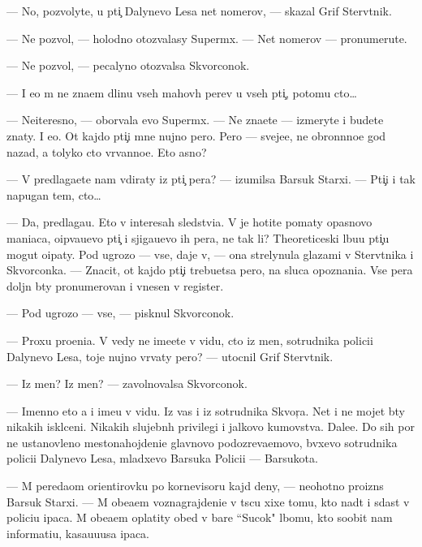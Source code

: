 \documentclass[12pt]{book}
\begin{document}
— No, pozvolyte, u pti{\c} Dalynevo Lesa net nomerov, — skazal Grif Sterv{\ia}tnik.

— Ne pozvol{\io}, — holodno otozvalasy Superm{\yi}x. — Net nomerov — pronumeru{\y}te.

— Ne pozvol{\io}, — pecalyno otozvalsa Skvorconok.

— I {\y}e{\x}o m{\yi} ne zna{\y}em dlinu vseh mahov{\yi}h per{\y}ev u vseh pti{\c}, potomu cto…

— Neiteresno, — oborvala {\y}evo Superm{\yi}x. — Ne zna{\y}ete — izmeryte i budete znaty. I {\y}e{\x}o. Ot kajdo{\y} pti{\c}i mne nujno pero. Pero — sveje{\y}e, ne obron{\e}nno{\y}e god nazad, a tolyko cto v{\yi}rvanno{\y}e. Eto {\y}asno?

— V{\yi} predlaga{\y}ete nam v{\yi}diraty iz pti{\c} per{\y}a? — izumilsa Barsuk Starxi{\y}. — Pti{\c}i i tak napugan{\yi} tem, cto…

— Da, predlaga{\y}u. Eto v interesah sledstvi{\y}a. V{\yi} je hotite po{\y}maty opasnovo maniaca, o{\x}ip{\yi}va{\y}u{\x}evo pti{\c} i sjiga{\y}u{\x}evo ih per{\y}a, ne tak li? Theoreticeski l{\io}bu{\y}u pti{\c}u mogut o{\x}ipaty. Pod ugrozo{\y} — vse, daje v{\yi}, — ona strelynula glazami v Sterv{\ia}tnika i Skvorconka. — Znacit, ot kajdo{\y} pti{\c}i trebu{\y}etsa pero, na sluca{\y} opoznani{\y}a. Vse per{\y}a doljn{\yi} b{\yi}ty pronumerovan{\yi} i vnesen{\yi} v register.

— Pod ugrozo{\y} — vse, — pisknul Skvorconok.

— Proxu pro{\x}eni{\y}a. V{\yi} vedy ne ime{\y}ete v vidu, cto iz men{\ia}, sotrudnika polici{\y}i Dalynevo Lesa, toje nujno v{\yi}rvaty pero? — utocnil Grif Sterv{\ia}tnik.

— Iz men{\ia}? Iz men{\ia}? — zavolnovalsa Skvorconok.

— Imenno eto {\y}a i ime{\y}u v vidu. Iz vas i iz sotrudnika Skvor{\c}a. Net i ne mojet b{\yi}ty nikakih iskl{\io}ceni{\y}. Nikakih slujebn{\yi}h privilegi{\y} i jalkovo kumovstva. Dale{\y}e. Do sih por ne ustanovleno mestonahojdeni{\y}e glavnovo podozreva{\y}emovo, b{\yi}vxevo sotrudnika polici{\y}i Dalynevo Lesa, mladxevo Barsuka Polici{\y}i — Barsukota.

— M{\yi} pereda{\y}om orientirovku po kornevisoru kajd{\yi}{\y} deny, — neohotno proizn{\e}s Barsuk Starxi{\y}. — M{\yi} obe{\x}a{\y}em voznagrajdeni{\y}e v t{\yi}s{\ia}cu xixe{\y} tomu, kto na{\y}d{\e}t i sdast v polici{\y}u {\X}ipaca. M{\yi} obe{\x}a{\y}em oplatity obed v bare ``Sucok" l{\io}bomu, kto soob{\x}it nam informati{\y}u, kasa{\y}u{\x}u{\y}usa {\X}ipaca.
\end{document}
